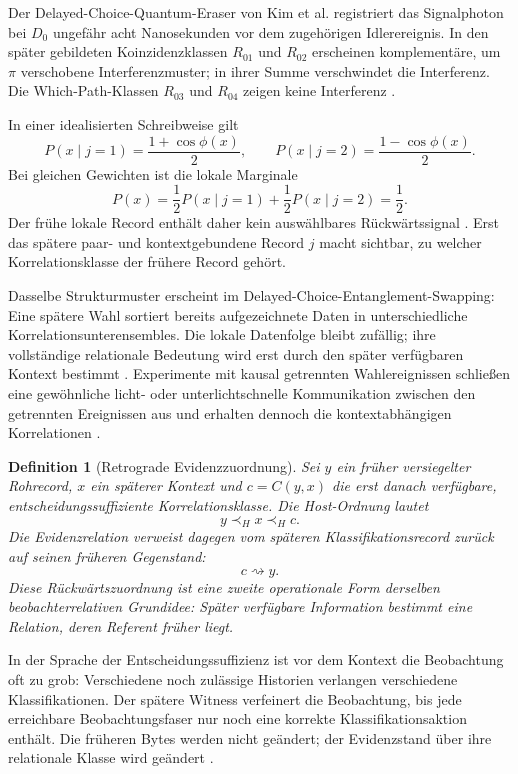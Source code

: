\documentclass[11pt,a4paper]{article}
\newtheorem{definition}{Definition}[section]
\theoremstyle{remark}
\newcommand{\host}{\prec_{\!H}}
\begin{document}
Der Delayed-Choice-Quantum-Eraser von Kim et al. registriert das Signalphoton
bei \(D_0\) ungefähr acht Nanosekunden vor dem zugehörigen Idlerereignis. In
den später gebildeten Koinzidenzklassen \(R_{01}\) und \(R_{02}\) erscheinen
komplementäre, um \(\pi\) verschobene Interferenzmuster; in ihrer Summe
verschwindet die Interferenz. Die Which-Path-Klassen \(R_{03}\) und
\(R_{04}\) zeigen keine Interferenz \cite{ScullyDruehl1982,Kim2000}.

In einer idealisierten Schreibweise gilt
\[
  P(x\mid j=1)=\frac{1+\cos\phi(x)}{2},\qquad
  P(x\mid j=2)=\frac{1-\cos\phi(x)}{2}.
\]
Bei gleichen Gewichten ist die lokale Marginale
\[
  P(x)=\frac12P(x\mid j=1)+\frac12P(x\mid j=2)=\frac12.
\]
Der frühe lokale Record enthält daher kein auswählbares Rückwärtssignal
\cite{Jordan1983}. Erst
das spätere paar- und kontextgebundene Record \(j\) macht sichtbar, zu welcher
Korrelationsklasse der frühere Record gehört.

Dasselbe Strukturmuster erscheint im Delayed-Choice-Entanglement-Swapping:
Eine spätere Wahl sortiert bereits aufgezeichnete Daten in unterschiedliche
Korrelationsunterensembles. Die lokale Datenfolge bleibt zufällig; ihre
vollständige relationale Bedeutung wird erst durch den später verfügbaren
Kontext bestimmt \cite{Ma2012}. Experimente mit kausal getrennten
Wahlereignissen schließen eine gewöhnliche licht- oder unterlichtschnelle
Kommunikation zwischen den getrennten Ereignissen aus und erhalten dennoch
die kontextabhängigen Korrelationen \cite{Jacques2007,Ma2013}.

\begin{definition}[Retrograde Evidenzzuordnung]
Sei \(y\) ein früher versiegelter Rohrecord, \(x\) ein späterer Kontext und
\(c=C(y,x)\) die erst danach verfügbare, entscheidungssuffiziente
Korrelationsklasse. Die Host-Ordnung lautet
\[
  y\host x\host c.
\]
Die Evidenzrelation verweist dagegen vom späteren Klassifikationsrecord
zurück auf seinen früheren Gegenstand:
\[
  c\rightsquigarrow y.
\]
Diese Rückwärtszuordnung ist eine zweite operationale Form derselben
beobachterrelativen Grundidee: Später verfügbare Information bestimmt eine
Relation, deren Referent früher liegt.
\end{definition}

In der Sprache der Entscheidungssuffizienz ist vor dem Kontext die
Beobachtung oft zu grob: Verschiedene noch zulässige Historien verlangen
verschiedene Klassifikationen. Der spätere Witness verfeinert die Beobachtung,
bis jede erreichbare Beobachtungsfaser nur noch eine korrekte
Klassifikationsaktion enthält. Die früheren Bytes werden nicht geändert; der
Evidenzstand über ihre relationale Klasse wird geändert
\cite{LohmannDecisionSufficiency2026}.
\end{document}
